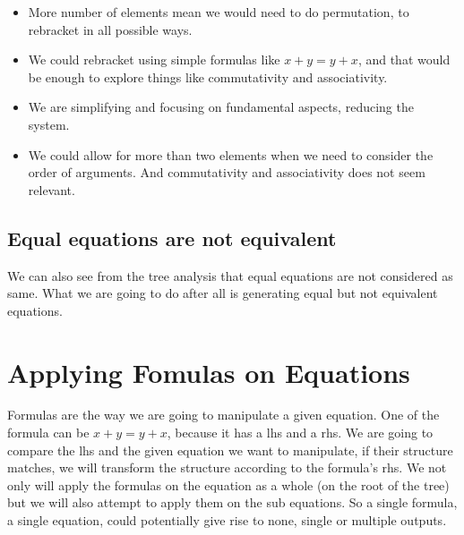 \documentclass{book}
\begin{document}
\begin{itemize}
    \item More number of elements mean we would need to do permutation, to rebracket in all possible ways.
    \item We could rebracket using simple formulas like \(x + y = y + x\), and that would be enough to explore things like commutativity and associativity.
    \item We are simplifying and focusing on fundamental aspects, reducing the system.
    \item We could allow for more than two elements when we need to consider the order of arguments. And commutativity and associativity does not seem relevant.
\end{itemize}

\subsection{Equal equations are not equivalent}

We can also see from the tree analysis that equal equations are not considered as same. What we are going to do after all is generating equal but not equivalent equations. 

\section{Applying Fomulas on Equations}

Formulas are the way we are going to manipulate a given equation. One of the formula can be \(x + y = y + x\), because it has a lhs and a rhs. We are going to compare the lhs and the given equation we want to manipulate, if their structure matches, we will transform the structure according to the formula's rhs.
We not only will apply the formulas on the equation as a whole (on the root of the tree) but we will also attempt to apply them on the sub equations. So a single formula, a single equation, could potentially give rise to none, single or multiple outputs.
\end{document}
